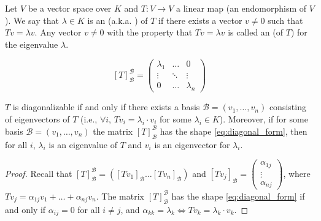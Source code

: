 \begin{definition}\label{def:eigenvalue_eigenvector}
  Let $V$ be a vector space over $K$ and $T: V \rightarrow V$ a linear map (an endomorphism of $V$). We say that $\lambda \in K$ is an  (a.k.a. ) of $T$ if there exists a vector $v \ne 0$ such that $Tv = \lambda v$. Any vector $v \ne 0$ with the property that $Tv = \lambda v$ is called an  (of $T$) for the eigenvalue $\lambda$.
\end{definition}

\begin{definition}\label{def:diagonalizable_endomorphism}
  \begin{equation} \label{eq:diagonal_form}
    [T]_{\mathcal{B}}^{\mathcal{B}} = \begin{pmatrix} \lambda_1 & \dots & 0 \\ \vdots & \ddots & \vdots \\ 0 & \dots & \lambda_n \end{pmatrix}
  \end{equation}
\end{definition}

\begin{lemma}\label{lem:diagonalizable_matrix_criterion}
  $T$ is diagonalizable if and only if there exists a basis $\mathcal{B}=(v_1, \dots, v_n)$ consisting of eigenvectors of $T$ (i.e., $\forall i$, $Tv_i = \lambda_i \cdot v_i$ for some $\lambda_i \in K$).
  Moreover, if for some basis $\mathcal{B}=(v_1, \dots, v_n)$ the matrix $[T]_{\mathcal{B}}^{\mathcal{B}}$ has the shape \eqref{eq:diagonal_form}, then for all $i$, $\lambda_i$ is an eigenvalue of $T$ and $v_i$ is an eigenvector for $\lambda_i$.
\end{lemma}

\begin{proof}
  Recall that $[T]_{\mathcal{B}}^{\mathcal{B}} = \left( [Tv_1]_{\mathcal{B}} \dots [Tv_n]_{\mathcal{B}} \right)$ and $[Tv_j]_{\mathcal{B}} = \begin{pmatrix} \alpha_{1j} \\ \vdots \\ \alpha_{nj} \end{pmatrix}$, where $Tv_j = \alpha_{1j}v_1 + \dots + \alpha_{nj}v_n$.
  The matrix $[T]_{\mathcal{B}}^{\mathcal{B}}$ has the shape \eqref{eq:diagonal_form} if and only if $\alpha_{ij} = 0$ for all $i \ne j$, and $\alpha_{kk} = \lambda_k \iff Tv_k = \lambda_k \cdot v_k$.
\end{proof}

